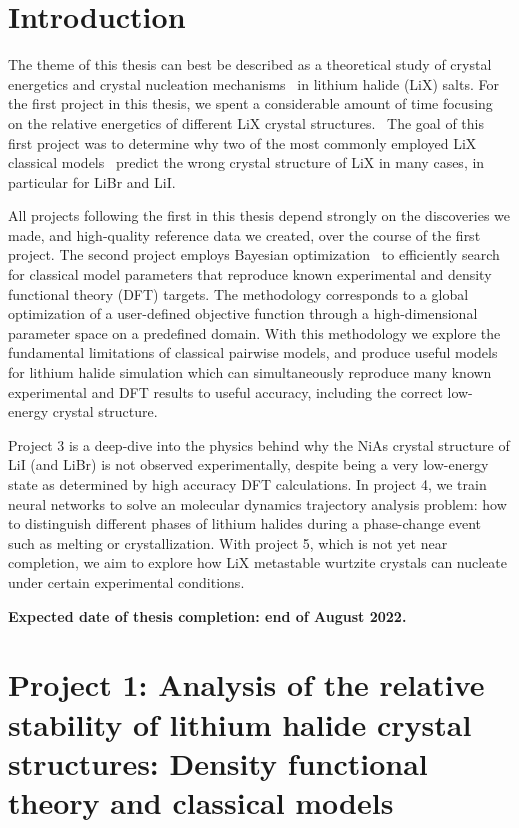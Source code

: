\documentclass[titlepage,11pt]{article}
\begin{document}

\justifying
\doublespacing

\section{Introduction}

The theme of this thesis can best be described as a theoretical study of crystal energetics and crystal nucleation mechanisms~\cite{Karthika2016} in lithium halide (LiX) salts. For the first project in this thesis, we spent a considerable amount of time focusing on the relative energetics of different LiX crystal structures.~\cite{scheiber2021analysis} The goal of this first project was to determine why two of the most commonly employed LiX classical models~\cite{Fumi1964,Tosi1964,Joung2008} predict the wrong crystal structure of LiX in many cases, in particular for LiBr and LiI.

All projects following the first in this thesis depend strongly on the discoveries we made, and high-quality reference data we created, over the course of the first project. The second project employs Bayesian optimization~\cite{mockus2012bayesian} to efficiently search for classical model parameters that reproduce known experimental and density functional theory (DFT) targets. The methodology corresponds to a global optimization of a user-defined objective function through a high-dimensional parameter space on a predefined domain. With this methodology we explore the fundamental limitations of classical pairwise models, and produce useful models for lithium halide simulation which can simultaneously reproduce many known experimental and DFT results to useful accuracy, including the correct low-energy crystal structure.

Project 3 is a deep-dive into the physics behind why the NiAs crystal structure of LiI (and LiBr) is not observed experimentally, despite being a very low-energy state as determined by high accuracy DFT calculations. In project 4, we train neural networks to solve an molecular dynamics trajectory analysis problem: how to distinguish different phases of lithium halides during a phase-change event such as melting or crystallization. With project 5, which is not yet near completion, we aim to explore how LiX metastable wurtzite crystals can nucleate under certain experimental conditions.

\textbf{Expected date of thesis completion: end of August 2022.}

\section{Project 1: Analysis of the relative stability of lithium halide crystal structures: Density functional theory and classical models}
\end{document}
